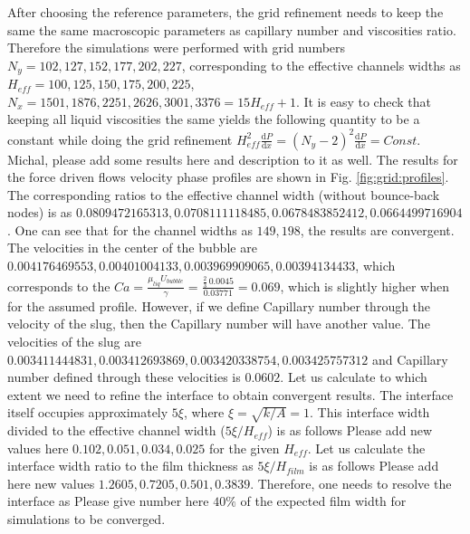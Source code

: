 \documentclass{article}
\begin{document}
After choosing the reference parameters, the grid refinement needs to keep the
same the same macroscopic parameters as capillary number and viscosities ratio.
Therefore the simulations were performed with grid
numbers $N_y=102,127,152,177,202,227$, corresponding to the
effective channels widths as $H_{eff}=100,125,150,175,200,225$,
$N_x=1501,1876,2251,2626,3001,3376=15
H_{eff}+1$. It is easy to check
that keeping all liquid viscosities the same yields the following quantity to
be a
constant while doing the grid refinement
$H_{eff}^2\frac{\mathrm{d}P}{\mathrm{d}x}=(N_y-2)^2\frac{\mathrm{d}P}{\mathrm{d}
x } =Const$.
{\color{red} Michal, please add some results here and description to it as well.
The results for the force driven flows velocity phase profiles are shown in
Fig. \ref{fig:grid:profiles}. The corresponding ratios to the effective channel
width (without bounce-back nodes) is as $0.0809472165313,
0.0708111118485, 0.0678483852412, 0.0664499716904$. One can see
that for the channel widths as $149,198$, the results are convergent. The
velocities in the center of the bubble are $0.004176469553,
0.00401004133, 0.003969909065, 0.00394134433$, which corresponds
to the $Ca=\frac{\mu_{liq} U_{bubble}}{\gamma}=\frac{\frac{2}{3}\,
0.0045}{0.03771}=0.069$, which is slightly higher when for the assumed
profile. However, if we define Capillary number through the velocity of the
slug, then the Capillary number will have another value. The velocities of the
slug are $0.003411444831,0.003412693869,0.003420338754,0.003425757312$ and
Capillary number defined through these velocities is $0.0602$. 
}
Let us calculate to which extent we need to refine the interface to obtain
convergent results. The interface itself occupies approximately $5 \xi$, where
$\xi=\sqrt{k/A}=1$. This interface width divided to the effective channel width
($5\xi/H_{eff}$) is as follows {\color{red} Please add new values here
$0.102,0.051,0.034,0.025$ } for the given
$H_{eff}$. Let us calculate the interface width ratio to the film thickness as
$5\xi/H_{film}$ is as follows
{\color{red} Please add here new values $1.2605,  0.7205,  0.501,  0.3839$}.
Therefore, one needs to
resolve the interface as {\color{red} Please give number here $40\%$} of the
expected film width for simulations to be converged.
\end{document}
